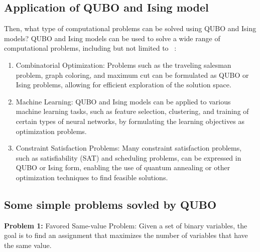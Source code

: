 \subsection{Application of QUBO and Ising model}
Then, what type of computational problems can be solved using QUBO and Ising models?
QUBO and Ising models can be used to solve a wide range of computational problems, including but not limited to ~\cite{Lucas_2014}:
\begin{enumerate}
    \item  Combinatorial Optimization: Problems such as the traveling salesman problem, graph coloring, and maximum cut can be formulated as QUBO or Ising problems, allowing for efficient exploration of the solution space.
    \item  Machine Learning: QUBO and Ising models can be applied to various machine learning tasks, such as feature selection, clustering, and training of certain types of neural networks, by formulating the learning objectives as optimization problems.
    \item  Constraint Satisfaction Problems: Many constraint satisfaction problems, such as satisfiability (SAT) and scheduling problems, can be expressed in QUBO or Ising form, enabling the use of quantum annealing or other optimization techniques to find feasible solutions.
\end{enumerate}

\subsection{Some simple problems sovled by QUBO}
\textbf{Problem 1:} Favored Same-value Problem: Given a set of binary variables, the goal is to find an assignment that maximizes the number of variables that have the same value. 

